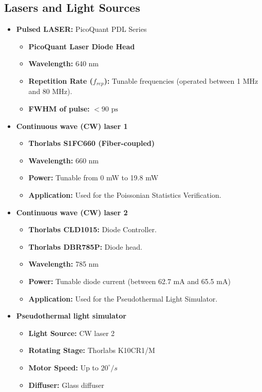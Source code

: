 \subsection*{Lasers and Light Sources}
\label{sec:lightsources}
\begin{itemize}
    \item \textbf{Pulsed LASER:} PicoQuant PDL Series
    \begin{itemize}\footnotesize
        \item \textbf{PicoQuant Laser Diode Head}
        \item \textbf{Wavelength:} 640 nm
        \item \textbf{Repetition Rate ($f_{rep}$):} Tunable frequencies (operated between 1 MHz and 80 MHz).
        \item \textbf{FWHM of pulse:} $< 90\text{ ps}$
    \end{itemize}
    
    \item \textbf{Continuous wave (CW) laser 1}
    \begin{itemize}\footnotesize
       \item \textbf{Thorlabs S1FC660 (Fiber-coupled)}
       \item \textbf{Wavelength:} 660 nm
       \item \textbf{Power:} Tunable from 0 mW to 19.8 mW
       \item \textbf{Application:} Used for the Poissonian Statistics Verification.
    \end{itemize}

    \item \textbf{Continuous wave (CW) laser 2}
    \begin{itemize}\footnotesize
        \item \textbf{Thorlabs CLD1015:} Diode Controller.
        \item \textbf{Thorlabs DBR785P:} Diode head.
        \item \textbf{Wavelength:} 785 nm
        \item \textbf{Power:} Tunable diode current (between 62.7 mA and 65.5 mA)
        \item \textbf{Application:} Used for the Pseudothermal Light Simulator.
    \end{itemize}

    \item \textbf{Pseudothermal light simulator}
    \begin{itemize}\footnotesize
        \item \textbf{Light Source:} CW laser 2
        \item \textbf{Rotating Stage:} Thorlabs K10CR1/M 
        \item \textbf{Motor Speed:} Up to $20^\circ /s$
        \item \textbf{Diffuser:} Glass diffuser %
    \end{itemize}
\end{itemize}

